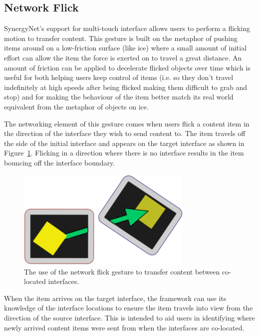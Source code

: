 \documentclass[a4paper,11pt]{article}
\begin{document}

\subsection{Network Flick}

SynergyNet's support for multi-touch interface allows users to perform a flicking~\cite{reetz-et-al:2006} motion to transfer content.
This gesture is built on the metaphor of pushing items around on a low-friction surface (like ice) where a small amount of initial effort can allow the item the force is exerted on to travel a great distance.
An amount of friction can be applied to decelerate flicked objects over time which is useful for both helping users keep control of items (i.e.
so they don't travel indefinitely at high speeds after being flicked making them difficult to grab and stop) and for making the behaviour of the item better match its real world equivalent from the metaphor of objects on ice.

The networking element of this gesture comes when users flick a content item in the direction of the interface they wish to send content to.
The item travels off the side of the initial interface and appears on the target interface as shown in Figure~\ref{fig:FlickExample}.
Flicking in a direction where there is no interface results in the item bouncing off the interface boundary.

\begin{figure}[h]
 \centering
   \includegraphics[width=0.75\textwidth]{figures/flickexample.png}
   \caption{The use of the network flick gesture to transfer content between co-located interfaces.}
   \label{fig:FlickExample}
\end{figure}

When the item arrives on the target interface, the framework can use its knowledge of the interface locations to ensure the item travels into view from the direction of the source interface.
This is intended to aid users in identifying where newly arrived content items were sent from when the interfaces are co-located.
\end{document}
